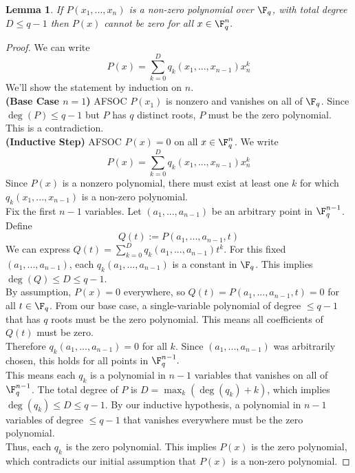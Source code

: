 \documentclass[a4paper]{article}
\newtheorem{lem}[thm]{Lemma}
\begin{document}
\newpage
\begin{lem} \label{lem:vanishing_poly}
    If $P(x_1,...,x_n)$ is a non-zero polynomial over $\F_q$, with total degree $D\leq q-1$ then $P(x)$ cannot be zero for all $x\in \F_q^n.$
\end{lem}
\begin{proof}
    We can write $$P(x)=\sum_{k=0}^{D}q_k(x_1,...,x_{n-1})x_n^k$$
    We'll show the statement by induction on $n$.\\[1ex]
    \textbf{(Base Case $n=1$)} AFSOC $P(x_1)$ is nonzero and vanishes on all of $\F_q$. Since $\deg(P)\leq q-1$ but $P$ has $q$ distinct roots, $P$ must be the zero polynomial. This is a contradiction. \\[1ex]
    \textbf{(Inductive Step)} AFSOC $P(x)=0$ on all $x\in \F_q^n$. We write $$P(x)=\sum_{k=0}^{D}q_k(x_1,...,x_{n-1})x_n^k$$
    Since $P(x)$ is a nonzero polynomial, there must exist at least one $k$ for which $q_k(x_1,...,x_{n-1})$ is a non-zero polynomial.\\[1ex]
    Fix the first $n-1$ variables. Let $(a_1,...,a_{n-1})$ be an arbitrary point in $\F_q^{n-1}$. Define $$Q(t):=P(a_1,...,a_{n-1},t)$$ 
    We can express $Q(t)=\sum_{k=0}^D q_k(a_1,...,a_{n-1})t^k$. For this fixed $(a_1,...,a_{n-1})$, each $q_k(a_1,...,a_{n-1})$ is a constant in $\F_q$. This implies $\deg(Q)\leq D\leq q-1.$ \\[1ex]
    By assumption, $P(x)=0$ everywhere, so $Q(t)=P(a_1,...,a_{n-1},t)=0$ for all $t \in \F_q$. 
    From our base case, a single-variable polynomial of degree $\leq q-1$ that has $q$ roots must be the zero polynomial. This means all coefficients of $Q(t)$ must be zero. \\[1ex]
    Therefore $q_k(a_1,...,a_{n-1})=0$ for all $k.$ 
    Since $(a_1,...,a_{n-1})$ was arbitrarily chosen, this holds for all points in $\F_q^{n-1}.$\\[1ex]
    This means each $q_k$ is a polynomial in $n-1$ variables that vanishes on all of $\F_q^{n-1}$. The total degree of $P$ is $D = \max_k (\deg(q_k) + k)$, which implies $\deg(q_k) \le D \le q-1$. By our inductive hypothesis, a polynomial in $n-1$ variables of degree $\le q-1$ that vanishes everywhere must be the zero polynomial. \\[1ex]
    Thus, each $q_k$ is the zero polynomial. This implies $P(x)$ is the zero polynomial, which contradicts our initial assumption that $P(x)$ is a non-zero polynomial.
\end{proof}
\end{document}
